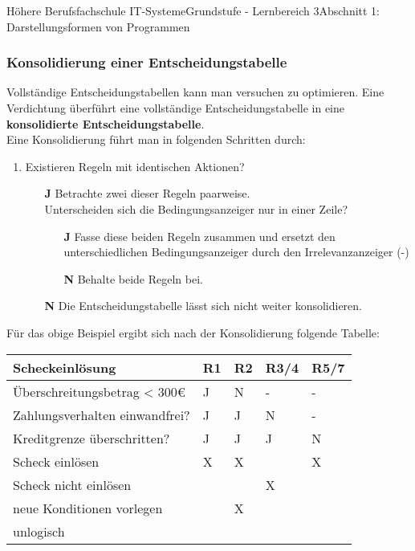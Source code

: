 \documentclass[11pt,oneside,openany,headings=optiontotoc,11pt,numbers=noenddot]{article}
\begin{document}
\begin{worksheet}{Höhere Berufsfachschule IT-Systeme}{Grundstufe - Lernbereich 3}{Abschnitt 1: Darstellungsformen von Programmen}
		\subsubsection{Konsolidierung einer Entscheidungstabelle}
		Vollständige Entscheidungstabellen kann man versuchen zu optimieren. Eine Verdichtung überführt eine vollständige Entscheidungstabelle in eine \textbf{konsolidierte Entscheidungstabelle}.\\
		Eine Konsolidierung führt man in folgenden Schritten durch:
		\begin{enumerate}
			\item Existieren Regeln mit identischen Aktionen?
			\begin{itemize}
				\item[\textbf{J}] Betrachte zwei dieser Regeln paarweise.\\
				Unterscheiden sich die Bedingungsanzeiger nur in einer Zeile?
				\begin{itemize}
					\item[\textbf{J}] Fasse diese beiden Regeln zusammen und ersetzt den unterschiedlichen Bedingungsanzeiger durch den Irrelevanzanzeiger (\grqq{}-\grqq{})
					\item[\textbf{N}] Behalte beide Regeln bei.
				\end{itemize}
				\item[\textbf{N}] Die Entscheidungstabelle lässt sich nicht weiter konsolidieren.
			\end{itemize}
		\end{enumerate}
		Für das obige Beispiel ergibt sich nach der Konsolidierung folgende Tabelle:\\
		\begin{tabularx}{\textwidth}{|l||M|M|M|M|}
			\hline
			\textbf{Scheckeinlösung} & \textbf{R1} & \textbf{R2} & \textbf{R3/4} & \textbf{R5/7}\\
			\hline
			Überschreitungsbetrag < 300\euro & J & N & - & - \\
			\hline
			Zahlungsverhalten einwandfrei? & J & J & N & - \\
			\hline
			Kreditgrenze überschritten? & J & J & J & N \\
			\hline
			\hline
			Scheck einlösen & X & X & & X \\
			\hline
			Scheck nicht einlösen & & & X & \\
			\hline
			neue Konditionen vorlegen & & X & & \\
			\hline
			unlogisch & & & & \\
			\hline
		\end{tabularx}

\end{worksheet}
\end{document}
